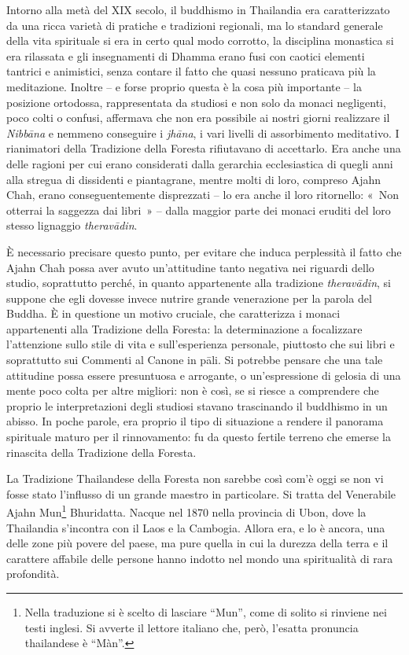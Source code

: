 Intorno alla metà del XIX secolo, il buddhismo in Thailandia era
caratterizzato da una ricca varietà di pratiche e tradizioni regionali,
ma lo standard generale della vita spirituale si era in certo qual modo
corrotto, la disciplina monastica si era rilassata e gli insegnamenti di
Dhamma erano fusi con caotici elementi tantrici e animistici, senza
contare il fatto che quasi nessuno praticava più la meditazione. Inoltre
-- e forse proprio questa è la cosa più importante -- la posizione
ortodossa, rappresentata da studiosi e non solo da monaci negligenti,
poco colti o confusi, affermava che non era possibile ai nostri giorni
realizzare il \emph{Nibbāna} e nemmeno conseguire i \emph{jhāna}, i vari
livelli di assorbimento meditativo. I rianimatori della Tradizione della
Foresta rifiutavano di accettarlo. Era anche una delle ragioni per cui
erano considerati dalla gerarchia ecclesiastica di quegli anni alla
stregua di dissidenti e piantagrane, mentre molti di loro, compreso
Ajahn Chah, erano conseguentemente disprezzati -- lo era anche il loro
ritornello: «~Non otterrai la saggezza dai libri~» -- dalla maggior
parte dei monaci eruditi del loro stesso lignaggio \emph{theravādin}.

È necessario precisare questo punto, per evitare che induca perplessità
il fatto che Ajahn Chah possa aver avuto un'attitudine tanto negativa
nei riguardi dello studio, soprattutto perché, in quanto appartenente
alla tradizione \emph{theravādin}, si suppone che egli dovesse invece
nutrire grande venerazione per la parola del Buddha. È in questione un
motivo cruciale, che caratterizza i monaci appartenenti alla Tradizione
della Foresta: la determinazione a focalizzare l'attenzione sullo stile
di vita e sull'esperienza personale, piuttosto che sui libri e
soprattutto sui Commenti al Canone in pāli. Si potrebbe pensare che una
tale attitudine possa essere presuntuosa e arrogante, o un'espressione
di gelosia di una mente poco colta per altre migliori: non è così, se si
riesce a comprendere che proprio le interpretazioni degli studiosi
stavano trascinando il buddhismo in un abisso. In poche parole, era
proprio il tipo di situazione a rendere il panorama spirituale maturo
per il rinnovamento: fu da questo fertile terreno che emerse la
rinascita della Tradizione della Foresta.

La Tradizione Thailandese della Foresta non sarebbe così com'è oggi se
non vi fosse stato l'influsso di un grande maestro in particolare. Si
tratta del Venerabile Ajahn Mun\footnote{Nella traduzione si è scelto di
  lasciare ``Mun'', come di solito si rinviene nei testi inglesi. Si
  avverte il lettore italiano che, però, l'esatta pronuncia thailandese
  è ``Màn''.} Bhuridatta. Nacque nel 1870 nella provincia di Ubon, dove
la Thailandia s'incontra con il Laos e la Cambogia. Allora era, e lo è
ancora, una delle zone più povere del paese, ma pure quella in cui la
durezza della terra e il carattere affabile delle persone hanno indotto
nel mondo una spiritualità di rara profondità.

